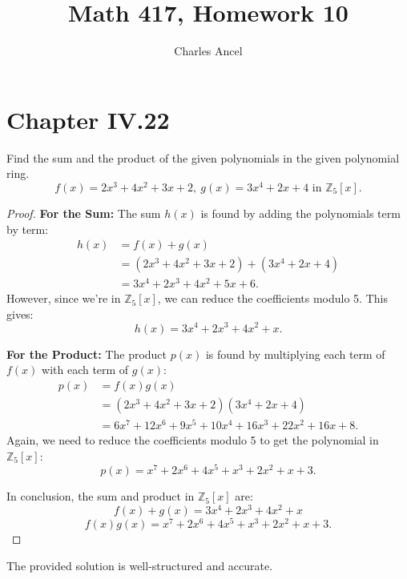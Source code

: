 \documentclass[12pt]{amsart}
\title{Math 417, Homework 10}
\author{Charles Ancel}
\theoremstyle{definition}
\numberwithin{equation}{section}
\theoremstyle{plain}
\newcommand{\Z}{\mathbb{Z}}
\begin{document}
\maketitle
\section*{Chapter IV.22}
\begin{exercise}{4} Find the sum and the product of the given polynomials in the given polynomial ring.
    \[f(x) = 2x^3 + 4x^2 + 3x + 2 , \  g(x) = 3x^4 + 2x + 4 \text{ in }\Z_5[x].\]

\begin{proof}
\textbf{For the Sum:}  
The sum \( h(x) \) is found by adding the polynomials term by term:
\begin{align*}
h(x) &= f(x) + g(x) \\
&= (2x^3 + 4x^2 + 3x + 2) + (3x^4 + 2x + 4) \\
&= 3x^4 + 2x^3 + 4x^2 + 5x + 6.
\end{align*}
However, since we're in \( \Z_5[x] \), we can reduce the coefficients modulo 5. This gives:
\[ h(x) = 3x^4 + 2x^3 + 4x^2 + x. \]

\textbf{For the Product:} 
The product \( p(x) \) is found by multiplying each term of \( f(x) \) with each term of \( g(x) \):
\begin{align*}
p(x) &= f(x)g(x) \\
&= (2x^3 + 4x^2 + 3x + 2)(3x^4 + 2x + 4) \\
&= 6x^7 + 12x^6 + 9x^5 + 10x^4 + 16x^3 + 22x^2 + 16x + 8.
\end{align*}
Again, we need to reduce the coefficients modulo 5 to get the polynomial in \( \Z_5[x] \):
\[ p(x) = x^7 + 2x^6 + 4x^5 + x^3 + 2x^2 + x + 3. \]

In conclusion, the sum and product in \( \Z_5[x] \) are:
\[ f(x) + g(x) = 3x^4 + 2x^3 + 4x^2 + x \]
\[ f(x)g(x) = x^7 + 2x^6 + 4x^5 + x^3 + 2x^2 + x + 3. \]
\end{proof}

The provided solution is well-structured and accurate.
    
\end{exercise}
\vspace*{20pt}
\end{document}
